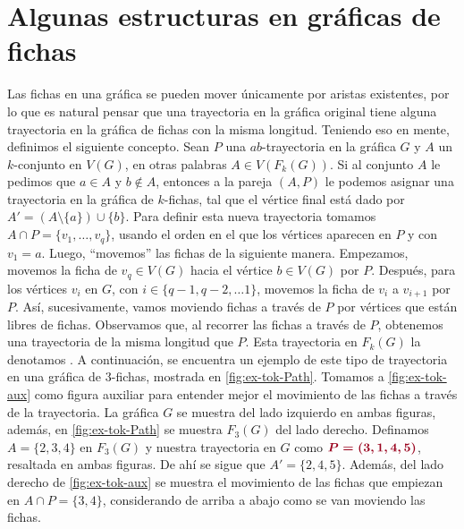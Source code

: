 \section{Algunas estructuras en gr\'aficas de fichas}%
\label{sec:}

Las fichas en una gr\'afica se pueden mover \'unicamente por aristas existentes,
por lo que es natural pensar que una trayectoria en la gr\'afica original tiene
alguna trayectoria en la gr\'afica de fichas con la misma longitud. Teniendo eso
en mente, definimos el siguiente concepto. Sean $P$ una $ab$-trayectoria en la
gr\'afica $G$ y $A$ un $k$-conjunto en $V(G)$, en otras palabras $A \in
V(F_k(G))$. Si al conjunto $A$ le pedimos que $a\in A$ y $b \notin A$, entonces
a la pareja $(A,P)$ le podemos asignar una trayectoria en la gr\'afica de
$k$-fichas, tal que el v\'ertice final est\'a dado por $A'=(A \setminus \{a\})
\cup \{b\}$. Para definir esta nueva trayectoria tomamos $A\cap P =\{v_1, \dots,
v_q\}$, usando el orden en el que los v\'ertices aparecen en $P$ y con $v_1 =
a$. Luego, ``movemos'' las fichas de la siguiente manera. Empezamos, movemos la
ficha de $v_q \in V(G)$ hacia el v\'ertice $b \in V(G)$ por $P$. Despu\'es, para
los v\'ertices $v_i$ en $G$, con $i \in \{q-1, q-2, \dots 1\}$, movemos la ficha
de $v_i$ a $v_{i+1}$ por $P$. As\'i, sucesivamente, vamos moviendo fichas a
trav\'es de $P$ por v\'ertices que est\'an libres de fichas. Observamos que, al
recorrer las fichas a trav\'es de $P$, obtenemos una trayectoria de la misma
longitud que $P$. Esta trayectoria en $F_k(G)$ la denotamos
. A continuaci\'on, se encuentra un
ejemplo de este tipo de trayectoria en una gr\'afica de $3$-fichas, mostrada en
\cref{fig:ex-tok-Path}. Tomamos a \cref{fig:ex-tok-aux} como figura auxiliar
para entender mejor el movimiento de las fichas a trav\'es de la trayectoria. La
gr\'afica $G$ se muestra del lado izquierdo en ambas figuras, adem\'as, en
\cref{fig:ex-tok-Path} se muestra $F_3(G)$ del lado derecho. Definamos
$A=\{2,3,4\}$ en $F_3(G)$ y nuestra trayectoria en $G$ como
${\color{vino}\boldsymbol {P= (3,1,4,5)}}$, resaltada en ambas figuras. De ah\'i
se sigue que $A'=\{2,4,5\}$. Adem\'as, del lado derecho de \cref{fig:ex-tok-aux}
se muestra el movimiento de las fichas que empiezan en $A \cap P =\{3,4\}$,
considerando de arriba a abajo como se van moviendo las fichas.

